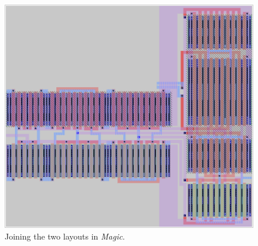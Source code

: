 \documentclass[11pt]{article}
\begin{document}
    \begin{figure}[!ht]
        \centering
        \includegraphics[width=1.1\linewidth, angle=-90]{../img/joint_mag.png}
        \caption{Joining the two layouts in \textit{Magic}.}
        \label{fig:joitmag}
    \end{figure}
    \FloatBarrier
\end{document}
